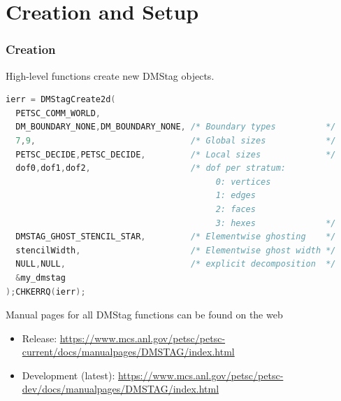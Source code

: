 \documentclass{beamer}
\begin{document}
\section{Creation and Setup}

\begin{frame}[fragile]
\frametitle{Creation}
High-level functions create new DMStag objects.
\begin{lstlisting}[language=C,basicstyle=\scriptsize\ttfamily]
ierr = DMStagCreate2d(
  PETSC_COMM_WORLD,
  DM_BOUNDARY_NONE,DM_BOUNDARY_NONE, /* Boundary types          */
  7,9,                               /* Global sizes            */
  PETSC_DECIDE,PETSC_DECIDE,         /* Local sizes             */
  dof0,dof1,dof2,                    /* dof per stratum:
                                          0: vertices
                                          1: edges
                                          2: faces
                                          3: hexes              */
  DMSTAG_GHOST_STENCIL_STAR,         /* Elementwise ghosting    */
  stencilWidth,                      /* Elementwise ghost width */
  NULL,NULL,                         /* explicit decomposition  */
  &my_dmstag
);CHKERRQ(ierr);
\end{lstlisting}

  {\small
  Manual pages for all DMStag functions can be found on the web
  \begin{itemize}
      \item Release:
        {\tiny\href{https://www.mcs.anl.gov/petsc/petsc-current/docs/manualpages/DMSTAG/index.html}{https://www.mcs.anl.gov/petsc/petsc-current/docs/manualpages/DMSTAG/index.html}}
\item Development (latest):
  {\tiny
      \href{https://www.mcs.anl.gov/petsc/petsc-dev/docs/manualpages/DMSTAG/index.html}{https://www.mcs.anl.gov/petsc/petsc-dev/docs/manualpages/DMSTAG/index.html}}
  \end{itemize}
  }
\end{frame}
\end{document}
